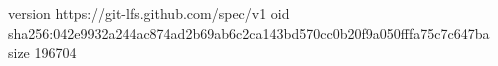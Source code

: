 version https://git-lfs.github.com/spec/v1
oid sha256:042e9932a244ac874ad2b69ab6c2ca143bd570cc0b20f9a050fffa75c7c647ba
size 196704
